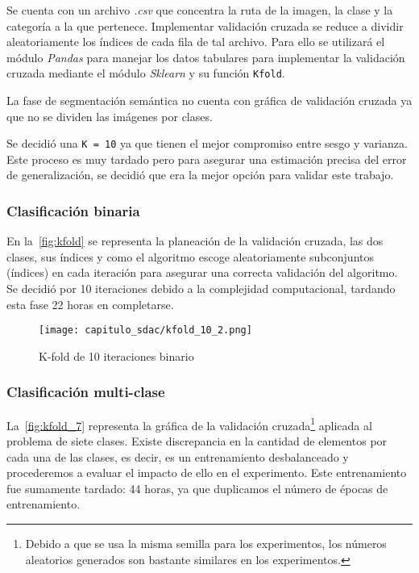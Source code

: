 Se cuenta con un archivo \emph{.csv} que concentra la ruta de la imagen, la clase y la
categoría a la que pertenece. Implementar validación cruzada se reduce a dividir
aleatoriamente los índices de cada fila de tal archivo. Para ello se utilizará
el módulo \emph{Pandas} para manejar los datos tabulares para implementar la
validación cruzada mediante el módulo \emph{Sklearn} y su función
\texttt{Kfold}.

La fase de segmentación semántica no cuenta con gráfica de validación cruzada ya
que no se dividen las imágenes por clases.

Se decidió una \texttt{K = 10} ya que tienen el mejor compromiso
entre sesgo y varianza. Este proceso es muy tardado pero para asegurar una
estimación precisa del error de generalización, se decidió que era la mejor
opción para validar este trabajo.

\subsubsection{Clasificación binaria}

En la~\autoref{fig:kfold} se representa la planeación de la validación cruzada,
las dos clases, sus índices y como el algoritmo escoge aleatoriamente
subconjuntos (índices) en cada iteración para asegurar una correcta validación
del algoritmo. Se decidió por 10 iteraciones debido a la complejidad
computacional, tardando esta fase 22 horas en completarse.

\begin{figure}[]
    \centering
    \texttt{[image: capitulo\_sdac/kfold\_10\_2.png]}
    \caption{K-fold de 10 iteraciones binario}\label{fig:kfold}
\end{figure}

\subsubsection{Clasificación multi-clase}

La~\autoref{fig:kfold_7} representa la gráfica de la validación
cruzada\footnote{Debido a que se usa la misma semilla para los experimentos, los
números aleatorios generados son bastante similares en los experimentos.}
aplicada al problema de siete clases. Existe discrepancia en la cantidad de
elementos por cada una de las clases, es decir, es un entrenamiento
desbalanceado y procederemos a evaluar el impacto de ello en el experimento.
Este entrenamiento fue sumamente tardado: 44 horas, ya que duplicamos el número
de épocas de entrenamiento.

